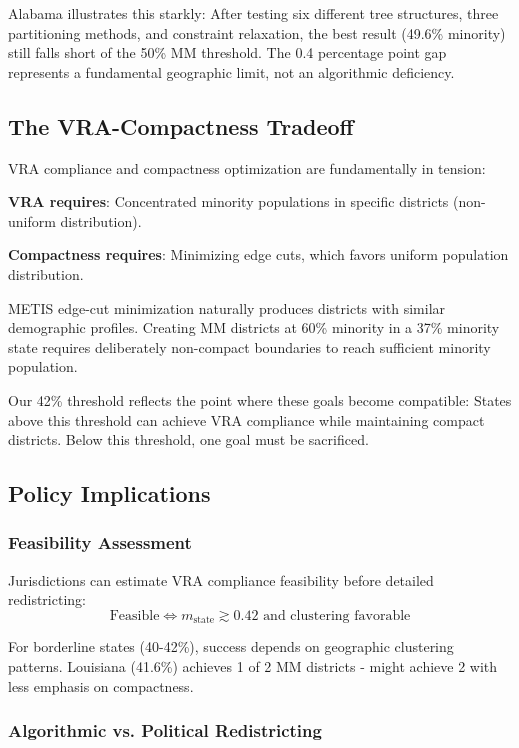 Alabama illustrates this starkly: After testing six different tree structures, three partitioning methods, and constraint relaxation, the best result (49.6\% minority) still falls short of the 50\% MM threshold. The 0.4 percentage point gap represents a fundamental geographic limit, not an algorithmic deficiency.

\subsection{The VRA-Compactness Tradeoff}

VRA compliance and compactness optimization are fundamentally in tension:

\textbf{VRA requires}: Concentrated minority populations in specific districts (non-uniform distribution).

\textbf{Compactness requires}: Minimizing edge cuts, which favors uniform population distribution.

METIS edge-cut minimization naturally produces districts with similar demographic profiles. Creating MM districts at 60\% minority in a 37\% minority state requires deliberately non-compact boundaries to reach sufficient minority population.

Our 42\% threshold reflects the point where these goals become compatible: States above this threshold can achieve VRA compliance while maintaining compact districts. Below this threshold, one goal must be sacrificed.

\subsection{Policy Implications}

\subsubsection{Feasibility Assessment}

Jurisdictions can estimate VRA compliance feasibility before detailed redistricting:
\begin{equation}
\text{Feasible} \iff m_{\text{state}} \gtrsim 0.42 \text{ and clustering favorable}
\end{equation}

For borderline states (40-42\%), success depends on geographic clustering patterns. Louisiana (41.6\%) achieves 1 of 2 MM districts - might achieve 2 with less emphasis on compactness.

\subsubsection{Algorithmic vs. Political Redistricting}


